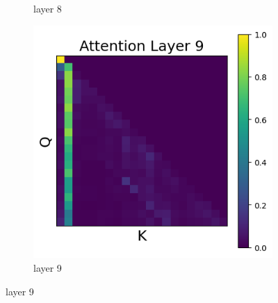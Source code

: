 \documentclass[11pt]{article}
\begin{document}
\begin{figure}[t]
\begin{subfigure}[t]{0.24\textwidth}
    \caption{layer 8}
  \end{subfigure}\hfill
      \begin{subfigure}[t]{0.24\textwidth}
    \centering
    \includegraphics[width=1.4\columnwidth]{figures/intervention3/layer_9.png}
    \caption{layer 9}
  \end{subfigure}\hfill
    

\end{figure}
\end{document}
